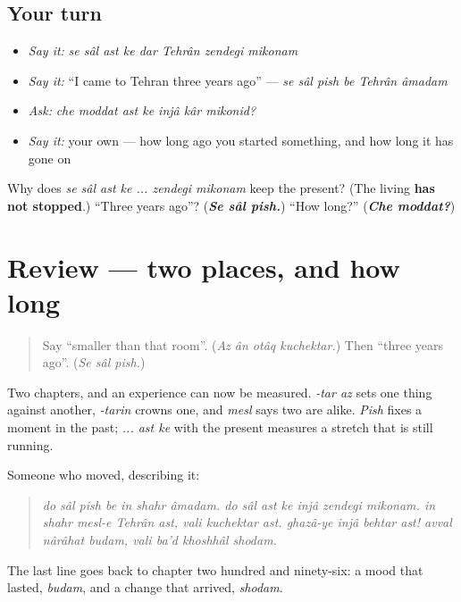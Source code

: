 \subsection*{Your turn}
\begin{itemize}
\raggedright
  \item \emph{Say it:} \emph{se sâl ast ke dar Tehrân zendegi mikonam}
  \item \emph{Say it:} \textquotedblleft{}I came to Tehran three years ago\textquotedblright{} — \emph{se sâl pish be Tehrân âmadam}
  \item \emph{Ask:} \emph{che moddat ast ke injâ kâr mikonid?}
  \item \emph{Say it:} your own — how long ago you started something, and how long it has gone on
\end{itemize}

\begin{tcolorbox}[breakable,colback=teal!4,colframe=teal!35!black,title={Before you move on}]
Why does \emph{se sâl ast ke ... zendegi mikonam} keep the present? (The living \textbf{has not stopped}.) \textquotedblleft{}Three years ago\textquotedblright{}? (\emph{\textbf{Se sâl pish.}}) \textquotedblleft{}How long?\textquotedblright{} (\emph{\textbf{Che moddat?}})
\end{tcolorbox}
\section[(review)]{Review — two places, and how long}

\label{lesson:FA-R297-comparing-and-time}



\begin{quote}
Say \textquotedblleft{}smaller than that room\textquotedblright{}. (\emph{Az ân otâq kuchektar.}) Then \textquotedblleft{}three years ago\textquotedblright{}. (\emph{Se sâl pish.})
\end{quote}

\begin{grammarlens}[title={What you've built}]
Two chapters, and an experience can now be measured. \emph{-tar az} sets one thing against another, \emph{-tarin} crowns one, and \emph{mesl} says two are alike. \emph{Pish} fixes a moment in the past; \emph{... ast ke} with the present measures a stretch that is still running.

Someone who moved, describing it:

\begin{quote}
\emph{do sâl pish be in shahr âmadam. do sâl ast ke injâ zendegi mikonam. in shahr mesl-e Tehrân ast, vali kuchektar ast. ghazâ-ye injâ behtar ast! avval nârâhat budam, vali ba'd khoshhâl shodam.}
\end{quote}

The last line goes back to chapter two hundred and ninety-six: a mood that lasted, \emph{budam}, and a change that arrived, \emph{shodam}.
\end{grammarlens}

